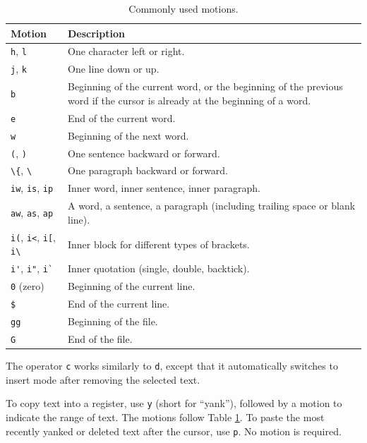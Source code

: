 \begin{table}[!htb]
  \centering \caption{Commonly used motions.}\label{ch:tfe:tab:motion}
  \begin{tabularx}{\textwidth}{lX}
    \hline
    Motion & Description \\ \hline
    \verb|h|, \verb|l| & One character left or right. \\ 
    \verb|j|, \verb|k| & One line down or up. \\ 
    \verb|b| & Beginning of the current word, or the beginning of the previous word if the cursor is already at the beginning of a word. \\ 
    \verb|e| & End of the current word. \\ 
    \verb|w| & Beginning of the next word. \\ 
    \verb|(|, \verb|)| & One sentence backward or forward. \\ 
    \lstinline{\{}, \lstinline{\}} & One paragraph backward or forward. \\ 
    \verb|iw|, \verb|is|, \verb|ip| & Inner word, inner sentence, inner paragraph. \\ 
    \verb|aw|, \verb|as|, \verb|ap| & A word, a sentence, a paragraph (including trailing space or blank line). \\ 
    \verb|i(|, \verb|i<|, \verb|i[|, \verb|i|\lstinline{\}} & Inner block for different types of brackets. \\
    \verb|i'|, \verb|i"|, \verb|i`| & Inner quotation (single, double, backtick). \\ 
    \verb|0| (zero) & Beginning of the current line. \\ 
    \verb|$| & End of the current line. \\ 
    \verb|gg| & Beginning of the file. \\ 
    \verb|G| & End of the file. \\
    \hline
  \end{tabularx}
\end{table}

The operator \verb|c| works similarly to \verb|d|, except that it automatically switches to insert mode after removing the selected text. 

To copy text into a register, use \verb|y| (short for ``yank''), followed by a motion to indicate the range of text. The motions follow Table \ref{ch:tfe:tab:motion}. To paste the most recently yanked or deleted text after the cursor, use \verb|p|. No motion is required.

